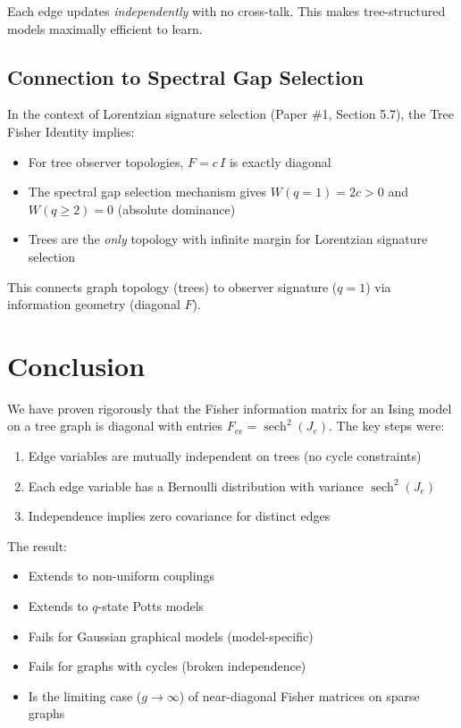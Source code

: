 \documentclass[11pt]{article}
\theoremstyle{definition}
\theoremstyle{remark}
\begin{document}
Each edge updates \emph{independently} with no cross-talk. This makes
tree-structured models maximally efficient to learn.

\subsection{Connection to Spectral Gap Selection}

In the context of Lorentzian signature selection (Paper \#1, Section 5.7),
the Tree Fisher Identity implies:

\begin{itemize}
\item For tree observer topologies, $F = c\, I$ is exactly diagonal

\item The spectral gap selection mechanism gives $W(q=1) = 2c > 0$ and
$W(q \geq 2) = 0$ (absolute dominance)

\item Trees are the \emph{only} topology with infinite margin for
Lorentzian signature selection
\end{itemize}

This connects graph topology (trees) to observer signature ($q = 1$) via
information geometry (diagonal $F$).

\section{Conclusion}

We have proven rigorously that the Fisher information matrix for an Ising
model on a tree graph is diagonal with entries
$F_{ee} = \operatorname{sech}^2(J_e)$. The key steps were:

\begin{enumerate}
\item Edge variables are mutually independent on trees (no cycle constraints)

\item Each edge variable has a Bernoulli distribution with variance
$\operatorname{sech}^2(J_e)$

\item Independence implies zero covariance for distinct edges
\end{enumerate}

The result:
\begin{itemize}
\item Extends to non-uniform couplings
\item Extends to $q$-state Potts models
\item Fails for Gaussian graphical models (model-specific)
\item Fails for graphs with cycles (broken independence)
\item Is the limiting case ($g \to \infty$) of near-diagonal Fisher
matrices on sparse graphs
\end{itemize}
\end{document}
